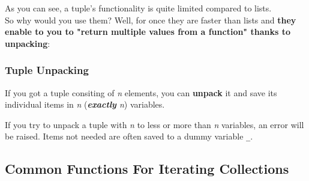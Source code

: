         As you can see, a tuple's functionality is quite limited compared to lists. \\
        So why would you use them? Well, for once they are faster than lists and
        \textbf{they enable to you to "return multiple values from a function" thanks to unpacking}:

        \subsubsection{Tuple Unpacking}

            If you got a tuple consiting of \textit{n} elements, you can \textbf{unpack} it and save
            its individual items in \textit{n} (\textit{\textbf{exactly} n}) variables.


            If you try to unpack a tuple with \textit{n} to less or more than \textit{n} variables,
            an error will be raised. Items not needed are often saved to a dummy variable \texttt{\_}.


    \subsection{Common Functions For Iterating Collections}
